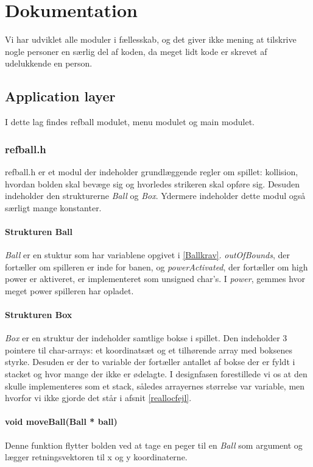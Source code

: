 \section{Dokumentation}
Vi har udviklet alle moduler i fællesskab, og det giver ikke mening at tilskrive nogle personer en særlig del af koden, da meget lidt kode er skrevet af udelukkende en person. 

\subsection{Application layer}
I dette lag findes refball modulet, menu modulet og main modulet.
\subsubsection{refball.h}
refball.h er et modul der indeholder grundlæggende regler om spillet: kollision, hvordan bolden skal bevæge sig og hvorledes strikeren skal opføre sig. Desuden indeholder den strukturerne \textit{Ball} og \textit{Box}. Ydermere indeholder dette modul også særligt mange konstanter.
\paragraph{Strukturen Ball}
\textit{Ball} er en stuktur som har variablene opgivet i \ref{Ballkrav}. \textit{outOfBounds}, der fortæller om spilleren er inde for banen, og \textit{powerActivated}, der fortæller om high power er aktiveret, er implementeret som unsigned char's. I \textit{power}, gemmes hvor meget power spilleren har opladet.
 

\paragraph{Strukturen Box}
\textit{Box} er en struktur der indeholder samtlige bokse i spillet. Den indeholder 3 pointere til char-arrays: et koordinatsæt og et tilhørende array med boksenes styrke. Desuden er der to variable der fortæller antallet af bokse der er fyldt i stacket og hvor mange der ikke er ødelagte. I designfasen forestillede vi os at den skulle implementeres som et stack, således arrayernes størrelse var variable, men hvorfor vi ikke gjorde det står i afsnit \ref{reallocfejl}.
\paragraph{void moveBall(Ball * ball)}
Denne funktion flytter bolden ved at tage en peger til en \textit{Ball} som argument og lægger retningsvektoren til x og y koordinaterne.
